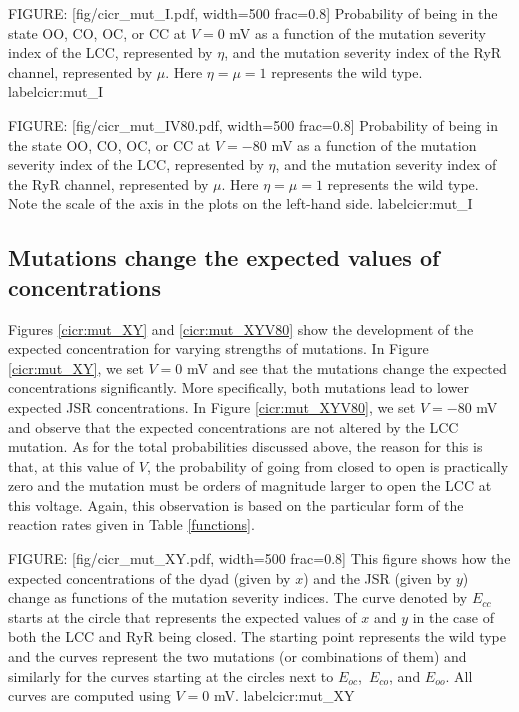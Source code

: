 FIGURE: [fig/cicr_mut_I.pdf, width=500 frac=0.8] Probability of being in the state OO, CO, OC, or CC at $V=0$ mV as a function of the mutation severity index of the LCC, represented by $\eta$, and the mutation severity index of the RyR channel, represented by $\mu$. Here $\eta=\mu=1$ represents the wild type. label{cicr:mut_I}

FIGURE: [fig/cicr_mut_IV80.pdf, width=500 frac=0.8] Probability of being in the state OO, CO, OC, or CC at $V=-80$ mV as a function of the mutation severity index of the LCC, represented by $\eta$, and the mutation severity index of the RyR channel, represented by $\mu$. Here $\eta=\mu=1$ represents the wild type. Note the scale of the axis in the plots on the left-hand side. label{cicr:mut_I}


\subsection{Mutations change the expected values of concentrations}

 Figures \ref{cicr:mut_XY} and \ref{cicr:mut_XYV80} show the development of the expected concentration for varying strengths of mutations. In Figure \ref{cicr:mut_XY}, we set $V=0$ mV and see that the mutations change the expected concentrations significantly. More specifically, both mutations lead to lower expected JSR concentrations. In Figure \ref{cicr:mut_XYV80}, we set $V=-80$ mV and observe that the expected concentrations are not altered by the LCC mutation. As for the total probabilities discussed above, the reason for this is that, at this value of $V$, the probability of going from closed to open is practically zero and the mutation must be orders of magnitude larger to open the LCC at this voltage. Again, this observation is based on the particular form of the reaction rates given in Table \ref{functions}.

FIGURE: [fig/cicr_mut_XY.pdf, width=500 frac=0.8] This figure shows how the expected concentrations of the dyad (given by $x$) and the JSR (given by $y$) change as functions of the mutation severity indices. The curve denoted by $E_{cc}$ starts at the circle that represents the expected values of $x$ and $y$ in the case of both the LCC and RyR being closed. The starting point represents the wild type and the curves represent the two mutations (or combinations of them) and similarly for the curves starting at the circles next to $E_{oc}$,\, $E_{co}$, and $E_{oo}$. All curves are computed using $V=0$ mV. label{cicr:mut_XY}

